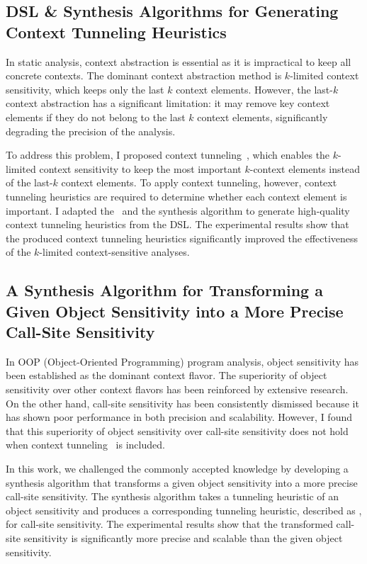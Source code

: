 \documentclass[11pt]{article}
\begin{document}
\subsection{DSL \& Synthesis Algorithms for Generating Context Tunneling Heuristics~\cite{JeJeOh18}}
%
In static analysis, context abstraction is essential as it is impractical to keep all concrete contexts. 
%
The dominant context abstraction method is $k$-limited context sensitivity, which keeps only the last $k$ context elements.
%
However, the last-$k$ context abstraction has a significant limitation: it may remove key context elements if they do not belong to the last $k$ context elements, significantly degrading the precision of the analysis.




To address this problem, I proposed context tunneling~\cite{JeJeOh18}, which enables the $k$-limited context sensitivity to keep the most important $k$-context elements instead of the last-$k$ context elements.
%
To apply context tunneling, however, context tunneling heuristics are required to determine whether each context element is important.
%
I adapted the \DisjunctiveModel~and the synthesis algorithm to generate high-quality context tunneling heuristics from the DSL.
%
The experimental results show that the produced context tunneling heuristics significantly improved the effectiveness of the $k$-limited context-sensitive analyses.



\subsection{A Synthesis Algorithm for Transforming a Given Object Sensitivity into a More Precise Call-Site Sensitivity~\cite{JeOh22}}
%
In OOP (Object-Oriented Programming) program analysis, object sensitivity has been established as the dominant context flavor.
%
The superiority of object sensitivity over other context flavors has been reinforced by extensive research.
%
On the other hand, call-site sensitivity has been consistently dismissed because it has shown poor performance in both precision and scalability.
%
However, I found that this superiority of object sensitivity over call-site sensitivity does not hold when context tunneling~\cite{JeJeOh18} is included. 


In this work, we challenged the commonly accepted knowledge by developing a synthesis algorithm that transforms a given object sensitivity into a more precise call-site sensitivity.
%
The synthesis algorithm takes a tunneling heuristic of an object sensitivity and produces a corresponding tunneling heuristic, described as \DisjunctiveModel, for call-site sensitivity.
%
The experimental results show that the transformed call-site sensitivity is significantly more precise and scalable than the given object sensitivity.
\end{document}
